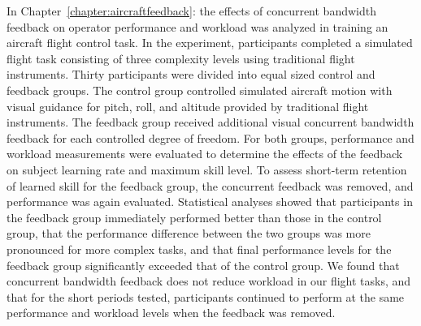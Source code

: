 In Chapter~\ref{chapter:aircraftfeedback}:  the effects of concurrent bandwidth feedback on operator performance and workload was analyzed in training an aircraft flight control task.
In the experiment, participants completed a simulated flight task consisting of three complexity levels using traditional flight instruments.
Thirty participants were divided into equal sized control and feedback groups.
The control group controlled simulated aircraft motion with visual guidance for pitch, roll, and altitude provided by traditional flight instruments.
The feedback group received additional visual concurrent bandwidth feedback for each controlled degree of freedom.
For both groups, performance and workload measurements were evaluated to determine the effects of the feedback on subject learning rate and maximum skill level.
To assess short-term retention of learned skill for the feedback group, the concurrent feedback was removed, and performance was again evaluated.
Statistical analyses showed that participants in the feedback group immediately performed better than those in the control group, that the performance difference between the two groups was more pronounced for more complex tasks, and that final performance levels for the feedback group significantly exceeded that of the control group.
We found that concurrent bandwidth feedback does not reduce workload in our flight tasks, and that for the short periods tested, participants continued to perform at the same performance and workload levels when the feedback was removed.

